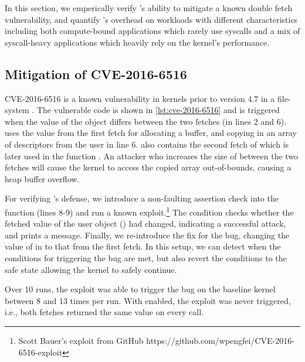 \documentclass[letterpaper,twocolumn,10pt]{article}
\begin{document}
In this section, we emperically verify \tiktok's ability to mitigate 
a known double fetch vulnerability, and quantify \tiktok's overhead on 
workloads with different characteristics including both compute-bound 
applications which rarely use syscalls and a mix of syscall-heavy applications 
which heavily rely on the kernel's performance.

\subsection{Mitigation of CVE-2016-6516}

CVE-2016-6516 is a known vulnerability in kernels prior to version
4.7 in a file-system . 
The vulnerable code is shown in \autoref{lst:cve-2016-6516} and is 
triggered when the value of the  object differs between 
the two fetches (in lines 2 and 6).
 uses the value from the first fetch for allocating a buffer, 
and copying in an array of descriptors from the user in line 6.
 also contains the second fetch of 
which is later used in the function .
An attacker who increases the size of  between the 
two fetches will cause the kernel to access the copied array out-of-bounds,
causing a heap buffer overflow.

For verifying \tiktok's defense, we introduce a non-faulting assertion check into the 
function (lines 8-9) and run a known exploit.\footnote{Scott Bauer's exploit 
from GitHub https://github.com/wpengfei/CVE-2016-6516-exploit}
The condition checks whether the fetched value of the user object ()
had changed, indicating a successful attack, and prints a message.
Finally, we re-introduce the fix for the bug, changing the value of 
 in  to that from the first fetch.
In this setup, we can detect when the conditions for triggering the bug are met, 
but also revert the conditions to the safe state allowing the kernel to safely
continue.

Over 10 runs, the exploit was able to trigger the bug on the baseline kernel
between 8 and 13 times per run. 
With \tiktok enabled, the exploit was never triggered, i.e., both fetches returned
the same value on every call.
\end{document}
